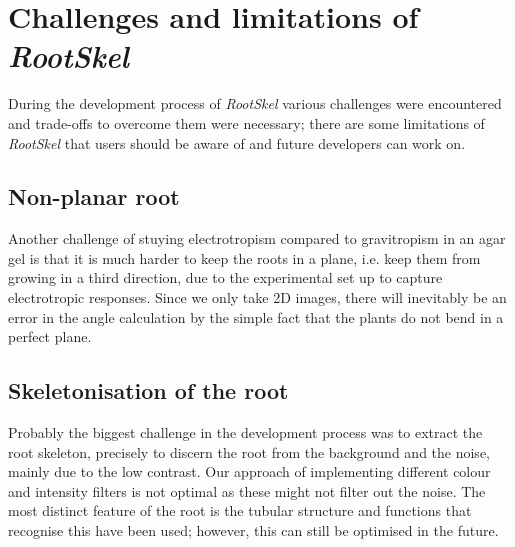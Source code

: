 \section{Challenges and limitations of \textit{RootSkel}}

During the development process of \textit{RootSkel} various challenges were encountered and trade-offs to overcome them were necessary; there are some limitations of \textit{RootSkel} that users should be aware of and future developers can work on.


\subsection{Non-planar root}

Another challenge of stuying electrotropism compared to gravitropism in an agar gel is that it is much harder to keep the roots in a plane, i.e. keep them from growing in a third direction, due to the experimental set up to capture electrotropic responses. Since we only take 2D images, there will inevitably be an error in the angle calculation by the simple fact that the plants do not bend in a perfect plane.


\subsection{Skeletonisation of the root}

Probably the biggest challenge in the development process was to extract the root skeleton, precisely to discern the root from the background and the noise, mainly due to the low contrast. %
Our approach of implementing different colour and intensity filters is not optimal as these might not filter out the noise. 
The most distinct feature of the root is the tubular structure and functions that recognise this have been used; however, this can still be optimised in the future.


